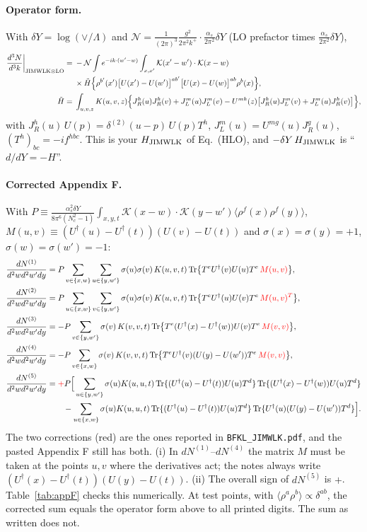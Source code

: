\documentclass[10pt]{article}
\numberwithin{equation}{section}
\newcommand{\KK}{\mathcal K}
\newcommand{\NN}{\mathcal N}
\newcommand{\Ud}{U^{\dagger}}
\newcommand{\Tr}{{\rm Tr}}
\begin{document}
\paragraph{Operator form.} With $\delta Y=\log(\vee/\Lambda)$ and $\NN=\frac{1}{(2\pi)^3}\frac{g^2}{2\pi^2k^+}\cdot\frac{\alpha_s}{2\pi^2}\delta Y$ (LO prefactor times $\frac{\alpha_s}{2\pi^2}\delta Y$),
\begin{align}
\frac{d^3N}{d^3k}\bigg|_{\rm JIMWLK\otimes LO}={}&-\NN\int e^{-ik\cdot(w'-w)}\int_{x,x'}\KK(x'-w')\cdot\KK(x-w)\notag\\
&\times\tilde H\Big\{\rho^{b'}(x')\big[U(x')-U(w')\big]^{ab'}\big[U(x)-U(w)\big]^{ab}\rho^b(x)\Big\},\notag\\
\tilde H={}&\int_{u,v,z}K(u,v,z)\Big\{J_R^h(u)J_R^h(v)+J_L^m(u)J_L^m(v)-U^{mh}(z)\big[J_R^h(u)J_L^m(v)+J_L^m(u)J_R^h(v)\big]\Big\},
\end{align}
with $J_R^h(u)\,U(p)=\delta^{(2)}(u-p)\,U(p)T^h$, $J_L^m(u)=U^{mg}(u)J_R^g(u)$, $(T^h)_{bc}=-if^{hbc}$. This is your $H_{\rm JIMWLK}$ of Eq.~(HLO), and $-\delta Y\,H_{\rm JIMWLK}$ is ``$d/dY=-H$''.
\paragraph{Corrected Appendix F.} With $P\equiv\frac{\alpha_s^2\delta Y}{8\pi^6(N_c^2-1)}\int_{x,y,t}\KK(x-w)\cdot\KK(y-w')\langle\rho^f(x)\rho^f(y)\rangle$, $M(u,v)\equiv(\Ud(u)-\Ud(t))(U(v)-U(t))$ and $\sigma(x)=\sigma(y)=+1$, $\sigma(w)=\sigma(w')=-1$:
\begin{align}
\frac{dN^{(1)}}{d^2wd^2w'dy}&=P\sum_{v\in\{x,w\}}\sum_{u\in\{y,w'\}}\sigma(u)\sigma(v)\,K(u,v,t)\,\Tr\big\{T^e\Ud(v)U(u)T^e\,\textcolor{red}{M(u,v)}\big\},\notag\\
\frac{dN^{(2)}}{d^2wd^2w'dy}&=P\sum_{u\in\{x,w\}}\sum_{v\in\{y,w'\}}\sigma(u)\sigma(v)\,K(u,v,t)\,\Tr\big\{T^e\Ud(u)U(v)T^e\,\textcolor{red}{M(u,v)^T}\big\},\notag\\
\frac{dN^{(3)}}{d^2wd^2w'dy}&=-P\sum_{v\in\{y,w'\}}\sigma(v)\,K(v,v,t)\,\Tr\big\{T^e(\Ud(x)-\Ud(w))U(v)T^e\,\textcolor{red}{M(v,v)}\big\},\notag\\
\frac{dN^{(4)}}{d^2wd^2w'dy}&=-P\sum_{v\in\{x,w\}}\sigma(v)\,K(v,v,t)\,\Tr\big\{T^e\Ud(v)(U(y)-U(w'))T^e\,\textcolor{red}{M(v,v)}\big\},\notag\\
\frac{dN^{(5)}}{d^2wd^2w'dy}&=\textcolor{red}{+}P\Big[\sum_{u\in\{y,w'\}}\sigma(u)K(u,u,t)\,\Tr\{(\Ud(u)-\Ud(t))U(u)T^d\}\,\Tr\{(\Ud(x)-\Ud(w))U(u)T^d\}\notag\\
&\qquad-\sum_{u\in\{x,w\}}\sigma(u)K(u,u,t)\,\Tr\{(\Ud(u)-\Ud(t))U(u)T^d\}\,\Tr\{\Ud(u)(U(y)-U(w'))T^d\}\Big].
\end{align}
The two corrections (red) are the ones reported in \texttt{BFKL\_JIMWLK.pdf}, and the pasted Appendix F still has both. (i) In $dN^{(1)}$--$dN^{(4)}$ the matrix $M$ must be taken at the points $u,v$ where the derivatives act; the notes always write $(\Ud(x)-\Ud(t))(U(y)-U(t))$. (ii) The overall sign of $dN^{(5)}$ is $+$. Table~\ref{tab:appF} checks this numerically. At test points, with $\langle\rho^a\rho^b\rangle\propto\delta^{ab}$, the corrected sum equals the operator form above to all printed digits. The sum as written does not.
\end{document}
